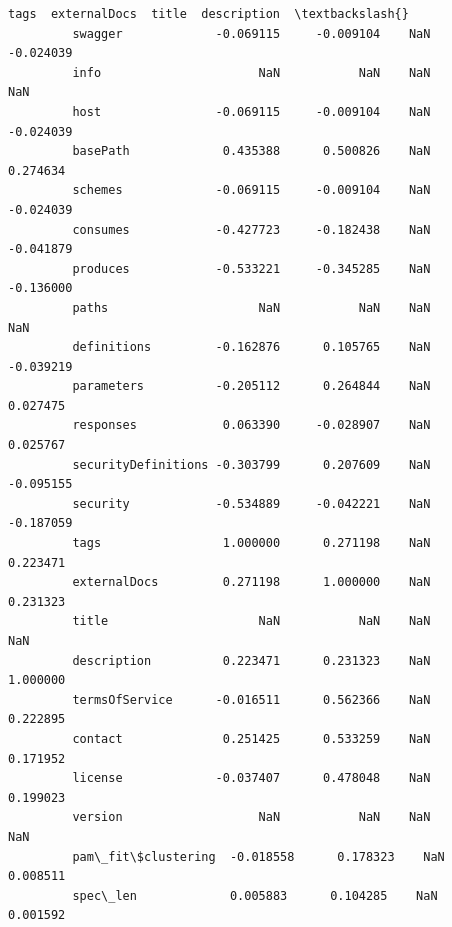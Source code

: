 \documentclass[11pt]{article}
\begin{document}
\begin{Verbatim}[commandchars=\\\{\}]
                                  tags  externalDocs  title  description  \textbackslash{}
         swagger             -0.069115     -0.009104    NaN    -0.024039   
         info                      NaN           NaN    NaN          NaN   
         host                -0.069115     -0.009104    NaN    -0.024039   
         basePath             0.435388      0.500826    NaN     0.274634   
         schemes             -0.069115     -0.009104    NaN    -0.024039   
         consumes            -0.427723     -0.182438    NaN    -0.041879   
         produces            -0.533221     -0.345285    NaN    -0.136000   
         paths                     NaN           NaN    NaN          NaN   
         definitions         -0.162876      0.105765    NaN    -0.039219   
         parameters          -0.205112      0.264844    NaN     0.027475   
         responses            0.063390     -0.028907    NaN     0.025767   
         securityDefinitions -0.303799      0.207609    NaN    -0.095155   
         security            -0.534889     -0.042221    NaN    -0.187059   
         tags                 1.000000      0.271198    NaN     0.223471   
         externalDocs         0.271198      1.000000    NaN     0.231323   
         title                     NaN           NaN    NaN          NaN   
         description          0.223471      0.231323    NaN     1.000000   
         termsOfService      -0.016511      0.562366    NaN     0.222895   
         contact              0.251425      0.533259    NaN     0.171952   
         license             -0.037407      0.478048    NaN     0.199023   
         version                   NaN           NaN    NaN          NaN   
         pam\_fit\$clustering  -0.018558      0.178323    NaN     0.008511   
         spec\_len             0.005883      0.104285    NaN     0.001592   
         

\end{Verbatim}
\end{document}
